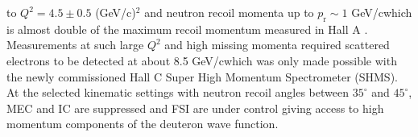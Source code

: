 to $Q^{2}=4.5\pm0.5$ (GeV/c)$^{2}$ and neutron recoil momenta up to $p_{\mathrm{r}}\sim 1$ GeV/c\DIFaddbegin \DIFadd{, }\DIFaddend which is almost double of the maximum recoil momentum measured in Hall A \cite{PhysRevLett.107.262501}.
Measurements at such large $Q^{2}$ and high missing momenta required scattered electrons to be detected at about 8.5 GeV/c\DIFaddbegin \DIFadd{, }\DIFaddend which was only made possible with the newly commissioned Hall C Super High Momentum Spectrometer (SHMS).
At the selected kinematic settings with neutron recoil angles between $35^{\circ}$ and $45^{\circ}$, MEC and IC are suppressed and FSI are under control giving access to high momentum components of the deuteron wave function.


